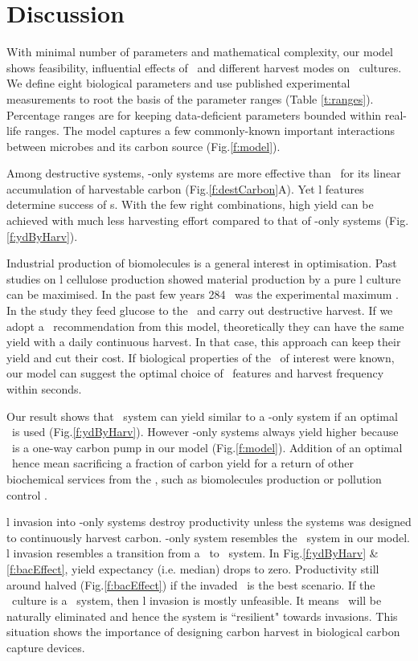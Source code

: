 \documentclass[../thesis.tex]{subfiles} %
\begin{document}
\section{Discussion}
With minimal number of parameters and mathematical complexity, our model shows feasibility, influential effects of \bac\ and different harvest modes on \phy\ cultures.  We define eight biological parameters and use published experimental measurements to root the basis of the parameter ranges (Table \ref{t:ranges}).  Percentage ranges are for keeping data-deficient parameters bounded within real-life ranges.  The model captures a few commonly-known important interactions between microbes and its carbon source (Fig.\ref{f:model}).

Among destructive systems, \phy-only systems are more effective than \pbs\ for its linear accumulation of harvestable carbon (Fig.\ref{f:destCarbon}A).  Yet \bac l features determine success of \pbs s.  With the few right combinations, high yield can be achieved with much less harvesting effort compared to that of \phy-only systems (Fig.\ref{f:ydByHarv}).

Industrial production of biomolecules is a general interest in optimisation.  Past studies on \bac l cellulose production showed material production by a pure \bac l culture can be maximised.  In the past few years 284 \dxdt\ was the experimental maximum \autocite{aytekin2016statistical}.  In the study they feed glucose to the \bac\ and carry out destructive harvest.  If we adopt a \phy\ recommendation from this model, theoretically they can have the same yield with a daily continuous harvest.  In that case, this approach can keep their yield and cut their cost.  If biological properties of the \bac\ of interest were known, our model can suggest the optimal choice of \phy\ features and harvest frequency within seconds.

Our result shows that \PBH\ system can yield similar to a \phy-only system if an optimal \bac\ is used (Fig.\ref{f:ydByHarv}).  However \phy-only systems always yield higher because \phy\ is a one-way carbon pump in our model (Fig.\ref{f:model}).  Addition of an optimal \bac\ hence mean sacrificing a fraction of carbon yield for a return of other biochemical services from the \bac, such as biomolecules production \autocite{aytekin2016statistical} or pollution control \autocite{dash2013marine,naik2013lead}.

\Bac l invasion into \phy-only systems destroy productivity unless the systems was designed to continuously harvest carbon.  \Phy-only system resembles the \PoN\ system in our model.  \Bac l invasion resembles a transition from a \PoN\ to \PBN\ system.  In Fig.\ref{f:ydByHarv} \& \ref{f:bacEffect}, yield expectancy (i.e. median) drops to zero.  Productivity still around halved (Fig.\ref{f:bacEffect}) if the invaded \bac\ is the best scenario.  If the \phy\ culture is a \PoH\ system, then \bac l invasion is mostly unfeasible.  It means \bac\ will be naturally eliminated and hence the system is ``resilient" towards invasions.  This situation shows the importance of designing carbon harvest in biological carbon capture devices.
\end{document}
